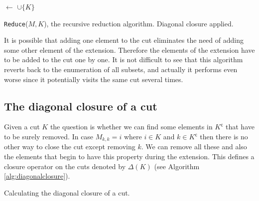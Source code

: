 \documentclass{amsart}
\newcommand{\compl}{\mathsf{c}}
\theoremstyle{plain}
\theoremstyle{definition}
\begin{document}
\begin{algorithm}[t]
\BlankLine
\Name{}

\Visited $\leftarrow$ \Visited$\cup \{K\}$\;
\caption{\texttt{Reduce}($M,K$), the recursive reduction algorithm.  Diagonal closure applied.}
\label{alg:basicrecursive}
\end{algorithm}
It is possible that adding one element to the cut eliminates the need of adding some other element of the extension.
Therefore the elements of the extension have to be added to the cut one by one. It is not difficult to see that this algorithm reverts back to the enumeration of all subsets, and actually it performs even worse since it potentially visits the same cut several times. 

\subsection{The diagonal closure of a cut}
Given a cut $K$ the question is whether we can find some elements in $K^\compl$ that have to be surely removed. In case $M_{k,k}=i$ where $i\in K$ and $k\in K^\compl$ then there is no other way to close the cut except removing $k$. We can remove all these and also the elements that begin to have this property during the extension. This defines a closure operator on the cuts denoted by $\Delta(K)$ (see Algorithm \ref{alg:diagonalclosure}).  
\begin{algorithm}[t]

\caption{Calculating the diagonal closure of a cut.}
\label{alg:diagonalclosure}
\end{algorithm}
\end{document}

